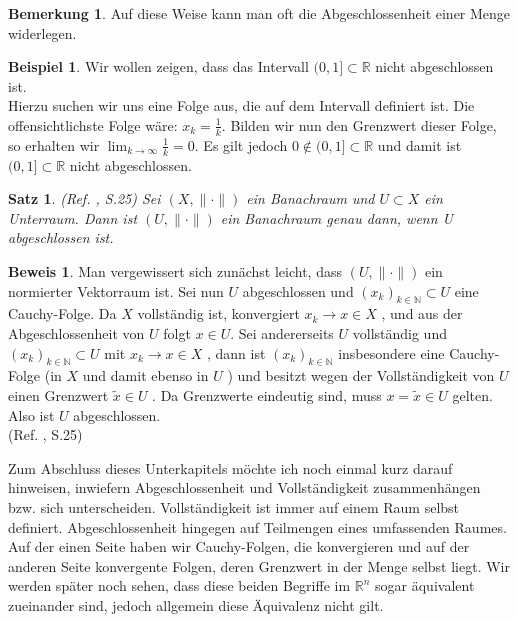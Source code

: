 \documentclass[10pt,a4paper]{article}
\theoremstyle{plain}
\newtheorem{satz}{Satz}[section]
\newenvironment{sa}{\begin{shaded}\begin{satz}}{\end{satz}\end{shaded}}
\theoremstyle{definition}
\theoremstyle{nonumberplain}
\newtheorem{beispiel}{Beispiel}
\newenvironment{bsp}{\begin{beispiel}}{\end{beispiel}}
\newtheorem{bemerkung}{Bemerkung}
\newenvironment{bem}{\begin{bemerkung}}{\end{bemerkung}}
\newtheorem{beweis}{Beweis}
\newenvironment{bew}{\begin{beweis}}{\end{beweis}}
\newcommand{\N}{\mathbb{N}}
\newcommand{\R}{\mathbb{R}}
\begin{document}
\begin{bem}
Auf diese Weise kann man oft die Abgeschlossenheit einer Menge widerlegen.
\end{bem}
\begin{bsp}
Wir wollen zeigen, dass das Intervall $(0,1] \subset \R$ nicht abgeschlossen ist.\\
Hierzu suchen wir uns eine Folge aus, die auf dem Intervall definiert ist. Die offensichtlichste Folge wäre: $x_k = \frac{1}{k}$. Bilden wir nun den Grenzwert dieser Folge, so erhalten wir $\lim_{k \to \infty}{\frac{1}{k}} = 0$. Es gilt jedoch $0 \notin (0,1] \subset \R$ und damit ist $(0,1] \subset \R$ nicht abgeschlossen.
\end{bsp}
\begin{sa}
\label{abgeschlossenerUnterraum}
(Ref. \cite{Clason}, S.25) Sei $(X , {\|\cdot\|})$ ein Banachraum und $U \subset X$ ein Unterraum. Dann ist $(U , {\|\cdot\|})$ ein Banachraum genau dann, wenn U abgeschlossen ist.
\end{sa}
\begin{bew}
Man vergewissert sich zunächst leicht, dass $(U , {\|\cdot\|})$ ein normierter Vektorraum ist. Sei nun $U$ abgeschlossen und $(x_k)_{k \in \N} \subset U$ eine Cauchy-Folge. Da $X$ vollständig ist, konvergiert $x_k \rightarrow x \in X$ , und aus der Abgeschlossenheit von $U$ folgt $x \in U$.\newline
Sei andererseits $U$ vollständig und $(x_k)_{k \in \N} \subset U$ mit $x_k \rightarrow x \in X$ , dann ist $(x_k)_{k \in \N}$ insbesondere eine Cauchy-Folge (in $X$ und damit ebenso in $U$ ) und besitzt wegen der Vollständigkeit von $U$ einen Grenzwert $ \tilde{x}\in U$ . Da Grenzwerte eindeutig sind, muss $x =\tilde{x} \in U$ gelten. Also ist $U$ abgeschlossen.\\ 
(Ref. \cite{Clason}, S.25) 
\end{bew}
Zum Abschluss dieses Unterkapitels möchte ich noch einmal kurz darauf hinweisen, inwiefern Abgeschlossenheit und Vollständigkeit zusammenhängen bzw. sich unterscheiden. Vollständigkeit ist immer auf einem Raum selbst definiert. Abgeschlossenheit hingegen auf Teilmengen eines umfassenden Raumes. Auf der einen Seite haben wir Cauchy-Folgen, die konvergieren und auf der anderen Seite konvergente Folgen, deren Grenzwert in der Menge selbst liegt. Wir werden später noch sehen, dass diese beiden Begriffe im $\R^n$ sogar äquivalent zueinander sind, jedoch allgemein diese Äquivalenz nicht gilt.
\newpage

\end{document}
